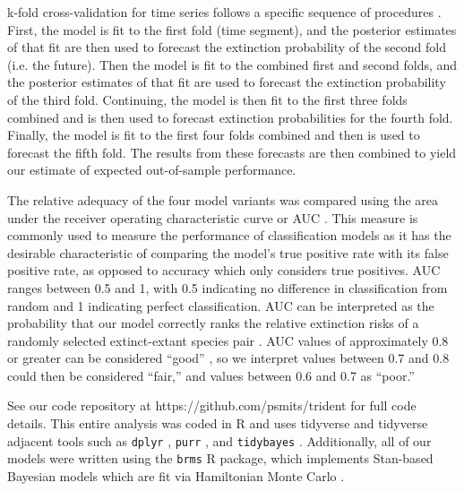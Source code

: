 \documentclass[12pt,letterpaper]{article}
\begin{document}
\begin{refsection}
k-fold cross-validation for time series follows a specific sequence of procedures \citep{Arlot2010,Bergmeir2016}. First, the model is fit to the first fold (time segment), and the posterior estimates of that fit are then used to forecast the extinction probability of the second fold (i.e. the future). Then the model is fit to the combined first and second folds, and the posterior estimates of that fit are used to forecast the extinction probability of the third fold. Continuing, the model is then fit to the first three folds combined and is then used to forecast extinction probabilities for the fourth fold. Finally, the model is fit to the first four folds combined and then is used to forecast the fifth fold. The results from these forecasts are then combined to yield our estimate of expected out-of-sample performance.

The relative adequacy of the four model variants was compared using the area under the receiver operating characteristic curve or AUC \citep{Fawcett2006,Mason2002}. This measure is commonly used to measure the performance of classification models as it has the desirable characteristic of comparing the model's true positive rate with its false positive rate, as opposed to accuracy which only considers true positives. AUC ranges between 0.5 and 1, with 0.5 indicating no difference in classification from random and 1 indicating perfect classification. AUC can be interpreted as the probability that our model correctly ranks the relative extinction risks of a randomly selected extinct-extant species pair \citep{Fawcett2006,Mason2002}. AUC values of approximately 0.8 or greater can be considered ``good'' \citep{ACCDA}, so we interpret values between 0.7 and 0.8 could then be considered ``fair,'' and values between 0.6 and 0.7 as ``poor.''


See our code repository at https://github.com/psmits/trident for full code details. This entire analysis was coded in R and uses tidyverse and tidyverse adjacent tools such as \texttt{dplyr} \citep{dplyr}, \texttt{purr} \citep{purrr}, and \texttt{tidybayes} \citep{tidybayes}. Additionally, all of our models were written using the \texttt{brms} \citep{brms2017,brms2018} R package, which implements Stan-based Bayesian models which are fit via Hamiltonian Monte Carlo \citep{StanManual}.



\end{refsection}
\end{document}
